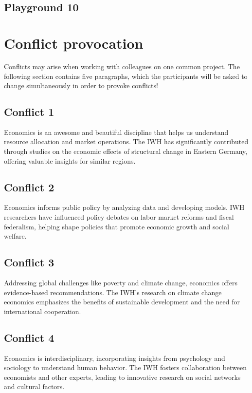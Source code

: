 \documentclass{article}
\begin{document}
\subsection{Playground 10}




\section{Conflict provocation}
Conflicts may arise when working with colleagues on one common project. The following section contains five paragraphs, which the participants will be asked to change simultaneously in order to provoke conflicts!

\subsection{Conflict 1}
Economics is an awesome and beautiful discipline that helps us understand resource allocation and market operations. The IWH has significantly contributed through studies on the economic effects of structural change in Eastern Germany, offering valuable insights for similar regions.

\subsection{Conflict 2}
Economics informs public policy by analyzing data and developing models. IWH researchers have influenced policy debates on labor market reforms and fiscal federalism, helping shape policies that promote economic growth and social welfare.

\subsection{Conflict 3}
Addressing global challenges like poverty and climate change, economics offers evidence-based recommendations. The IWH's research on climate change economics emphasizes the benefits of sustainable development and the need for international cooperation.

\subsection{Conflict 4}
Economics is interdisciplinary, incorporating insights from psychology and sociology to understand human behavior. The IWH fosters collaboration between economists and other experts, leading to innovative research on social networks and cultural factors.
\end{document}
